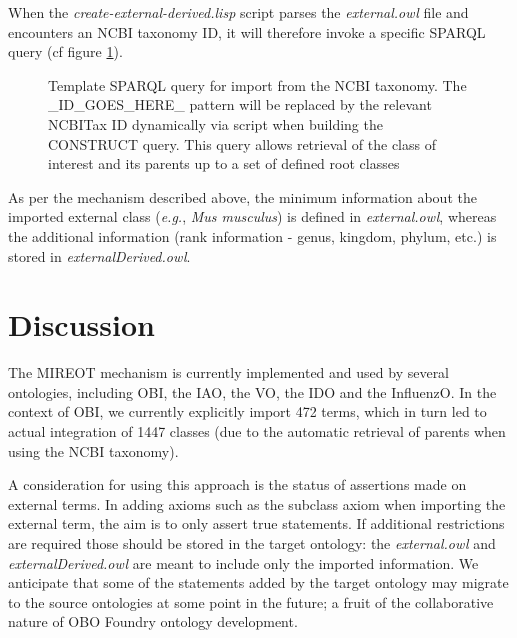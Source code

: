 \documentclass{ao2e}%
\begin{document}
When the \emph{create-external-derived.lisp} script parses the \emph{external.owl} file and encounters an NCBI taxonomy ID, it will therefore invoke a specific SPARQL query (cf figure \ref{fig:sparql2}). 

\begin{figure}[t]
\scriptsize
 
\caption{Template SPARQL query for import from the NCBI taxonomy. The \_ID\_GOES\_HERE\_ pattern will be replaced by the relevant NCBITax ID dynamically via script when building the CONSTRUCT query. This query allows retrieval of the class of interest and its parents up to a set of defined root classes}
\label{fig:sparql2}
\end{figure}
As per the mechanism described above, the minimum information about the imported external class (\emph{e.g.}, \emph{Mus musculus}) is defined in \emph{external.owl}, whereas the additional information (rank information - genus, kingdom, phylum, etc.) is stored in \emph{ externalDerived.owl}.


\section*{Discussion}

The \ac{MIREOT} mechanism is currently  implemented and used by several ontologies, including  \ac{OBI},  the \ac{IAO}\cite{IAO}, the \ac{VO}\cite{VO}, the \ac{IDO}\cite{IDO} and the \ac{InfluenzO}\cite{InfluenzO}.
In the context of \ac{OBI}, we currently explicitly import 472 terms, which in turn led to actual integration of 1447 classes (due to the automatic retrieval of parents when using the NCBI taxonomy). 

A consideration for using this approach is the status of assertions made on external terms.
In adding axioms such as the subclass axiom when importing the external term, the aim is to only assert true statements.
If additional restrictions are required those should be stored in the target ontology: the \emph{external.owl} and \emph{externalDerived.owl} are meant to include only the imported information.
We anticipate that some of the statements added by the target ontology may migrate to the source ontologies at some point in the future; a fruit of the collaborative nature of OBO Foundry ontology development. 
\end{document}
